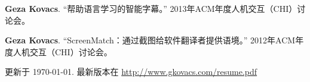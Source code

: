 \documentclass[margin,line]{resume}
\begin{document}
\begin{resume}
\textbf{Geza Kovacs}. ``帮助语言学习的智能字幕。'' 2013年ACM年度人机交互（CHI）讨论会。

\textbf{Geza Kovacs}. ``ScreenMatch：通过截图给软件翻译者提供语境。'' 2012年ACM年度人机交互（CHI）讨论会。


\begin{small}
\begin{center}
更新于 \today. 最新版本在 \href{http://www.gkovacs.com/resume.pdf}{http://www.gkovacs.com/resume.pdf}
\end{center}
\end{small}

\end{resume}
\end{document}
